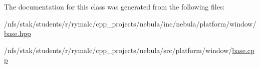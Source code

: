 The documentation for this class was generated from the following files:\begin{DoxyCompactItemize}
\item 
/nfs/stak/students/r/rymalc/cpp\_\-projects/nebula/inc/nebula/platform/window/\hyperlink{inc_2nebula_2platform_2window_2base_8hpp}{base.hpp}\item 
/nfs/stak/students/r/rymalc/cpp\_\-projects/nebula/src/platform/window/\hyperlink{src_2platform_2window_2base_8cpp}{base.cpp}\end{DoxyCompactItemize}
